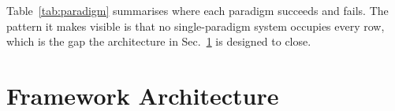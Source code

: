 \documentclass[10pt,conference]{IEEEtran}
\begin{document}
Table~\ref{tab:paradigm} summarises where each paradigm succeeds and fails.
The pattern it makes visible is that no single-paradigm system occupies every
row, which is the gap the architecture in Sec.~\ref{sec:arch} is designed to
close.

\begin{table}[t]
\centering
\caption{Paradigm comparison.}
\label{tab:paradigm}
\end{table}

\section{Framework Architecture}
\label{sec:arch}
\label{sec:architecture}
\end{document}

